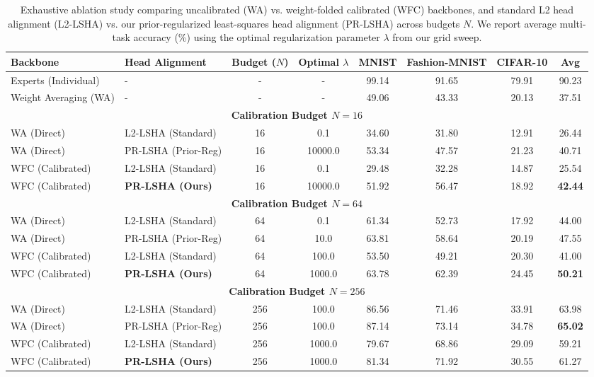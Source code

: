 \documentclass{article}
\theoremstyle{plain}
\theoremstyle{definition}
\theoremstyle{remark}
\begin{document}
\begin{table}[t]
\caption{Exhaustive ablation study comparing uncalibrated (WA) vs. weight-folded calibrated (WFC) backbones, and standard L2 head alignment (L2-LSHA) vs. our prior-regularized least-squares head alignment (PR-LSHA) across budgets $N$. We report average multi-task accuracy (\%) using the optimal regularization parameter $\lambda$ from our grid sweep.}
\label{tab:ablation_results}
\vskip 0.1in
\begin{center}
\begin{small}
\begin{sc}
\setlength{\tabcolsep}{3.0pt}
\begin{tabular}{llcccccc}
\toprule
Backbone & Head Alignment & Budget ($N$) & Optimal $\lambda$ & MNIST & Fashion-MNIST & CIFAR-10 & Avg \\
\midrule
Experts (Individual) & - & - & - & 99.14 & 91.65 & 79.91 & 90.23 \\
Weight Averaging (WA) & - & - & - & 49.06 & 43.33 & 20.13 & 37.51 \\
\midrule
\multicolumn{8}{c}{\textbf{Calibration Budget $N = 16$}} \\
\midrule
WA (Direct) & L2-LSHA (Standard) & 16 & 0.1 & 34.60 & 31.80 & 12.91 & 26.44 \\
WA (Direct) & PR-LSHA (Prior-Reg) & 16 & 10000.0 & 53.34 & 47.57 & 21.23 & 40.71 \\
WFC (Calibrated) & L2-LSHA (Standard) & 16 & 0.1 & 29.48 & 32.28 & 14.87 & 25.54 \\
WFC (Calibrated) & \textbf{PR-LSHA (Ours)} & 16 & 10000.0 & 51.92 & 56.47 & 18.92 & \textbf{42.44} \\
\midrule
\multicolumn{8}{c}{\textbf{Calibration Budget $N = 64$}} \\
\midrule
WA (Direct) & L2-LSHA (Standard) & 64 & 0.1 & 61.34 & 52.73 & 17.92 & 44.00 \\
WA (Direct) & PR-LSHA (Prior-Reg) & 64 & 10.0 & 63.81 & 58.64 & 20.19 & 47.55 \\
WFC (Calibrated) & L2-LSHA (Standard) & 64 & 100.0 & 53.50 & 49.21 & 20.30 & 41.00 \\
WFC (Calibrated) & \textbf{PR-LSHA (Ours)} & 64 & 1000.0 & 63.78 & 62.39 & 24.45 & \textbf{50.21} \\
\midrule
\multicolumn{8}{c}{\textbf{Calibration Budget $N = 256$}} \\
\midrule
WA (Direct) & L2-LSHA (Standard) & 256 & 100.0 & 86.56 & 71.46 & 33.91 & 63.98 \\
WA (Direct) & PR-LSHA (Prior-Reg) & 256 & 100.0 & 87.14 & 73.14 & 34.78 & \textbf{65.02} \\
WFC (Calibrated) & L2-LSHA (Standard) & 256 & 1000.0 & 79.67 & 68.86 & 29.09 & 59.21 \\
WFC (Calibrated) & \textbf{PR-LSHA (Ours)} & 256 & 1000.0 & 81.34 & 71.92 & 30.55 & 61.27 \\
\midrule
\bottomrule
\end{tabular}
\end{sc}
\end{small}
\end{center}
\vskip -0.1in
\end{table}
\end{document}
